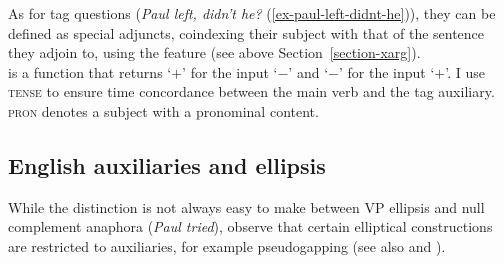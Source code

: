 \eal
{}
\zl

As for tag questions (\emph{Paul left, didn't he?} (\ref{ex-paul-left-didnt-he})), they can be defined as special adjuncts, coindexing their subject with that of the sentence they adjoin to, using the \xarg feature (see above Section~\ref{section-xarg}).
\ea
{} \impl\\
\z
{} is a function that returns `$+$' for the input `$-$' and `$-$' for the input `$+$'. I use \textsc{tense} to ensure time concordance between the main verb and the tag auxiliary. \textsc{pron} denotes a subject with a pronominal content.

\subsection{English auxiliaries and ellipsis}

While the distinction is not always easy to make between VP ellipsis and null complement anaphora
(\emph{Paul tried}), \citeauthor{Sagetal2020} observe that certain elliptical constructions are
restricted to auxiliaries, for example pseudogapping (see also
 and
\citealt{Miller2014a-u}).

\eal
{}
\zl

